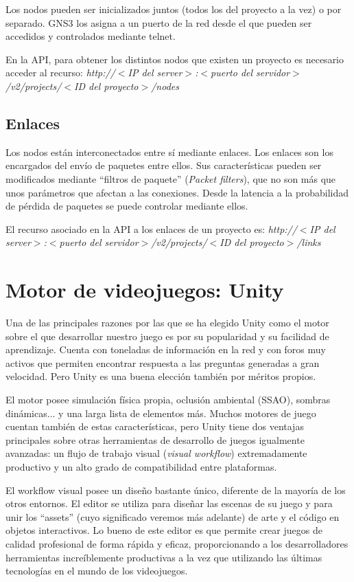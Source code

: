 Los nodos pueden ser inicializados juntos (todos los del proyecto a la vez) o por separado. GNS3 los asigna a un puerto de la red desde el que pueden ser accedidos y controlados mediante telnet.

En la API, para obtener los distintos nodos que existen un proyecto es necesario acceder al recurso: \textit{http://$<$IP del server$>$:$<$puerto del servidor$>$/v2/projects/$<$ID del proyecto$>$/nodes}

\subsection{Enlaces}
Los nodos están interconectados entre sí mediante enlaces. Los enlaces son los encargados del envío de paquetes entre ellos. Sus características pueden ser modificados mediante ``filtros de paquete'' (\textit{Packet filters}), que no son más que unos parámetros que afectan a las conexiones. Desde la latencia a la probabilidad de pérdida de paquetes se puede controlar mediante ellos.

El recurso asociado en la API a los enlaces de un proyecto es: \textit{http://$<$IP del server$>$:$<$puerto del servidor$>$/v2/projects/$<$ID del proyecto$>$/links}
 
\section{Motor de videojuegos: Unity}
Una de las principales razones por las que se ha elegido Unity como el motor sobre el que desarrollar nuestro juego es por su popularidad y su facilidad de aprendizaje. Cuenta con toneladas de información en la red y con foros muy activos que permiten encontrar respuesta a las preguntas generadas a gran velocidad. Pero Unity es una buena elección también por méritos propios.

El motor posee simulación física propia, oclusión ambiental (SSAO), sombras dinámicas... y una larga lista de elementos más. Muchos motores de juego cuentan también de estas características, pero Unity tiene dos ventajas principales sobre otras herramientas de desarrollo de juegos igualmente avanzadas: un flujo de trabajo visual (\textit{visual workflow}) extremadamente productivo y un alto grado de compatibilidad entre plataformas.

El workflow visual posee un diseño bastante único, diferente de la mayoría de los otros entornos. El editor se utiliza para diseñar las escenas de su juego y para unir los ``assets'' (cuyo significado veremos más adelante) de arte y el código en objetos interactivos. Lo bueno de este editor es que permite crear juegos de calidad profesional de forma rápida y eficaz, proporcionando a los desarrolladores herramientas increíblemente productivas a la vez que utilizando las últimas tecnologías en el mundo de los videojuegos.